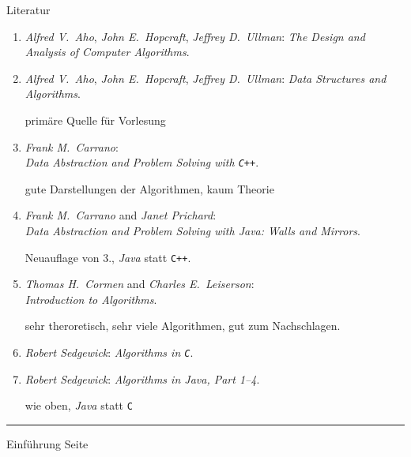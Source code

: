 \documentclass{slides}
\newcounter{mypage}
\begin{document}
\begin{slide}{}
\normalsize

\begin{center}
Literatur
\end{center}
\vspace*{0.5cm}

\footnotesize
\begin{enumerate}
\item \textsl{Alfred V.~Aho}, \textsl{John E.~Hopcraft}, \textsl{Jeffrey D.~Ullman}:
      \emph{The Design and Analysis of Computer Algorithms}. 

\item \textsl{Alfred V.~Aho}, \textsl{John E.~Hopcraft}, \textsl{Jeffrey D.~Ullman}:
      \emph{Data Structures and Algorithms}. 

      prim\"are Quelle f\"ur Vorlesung
\item \textsl{Frank M.~Carrano}: \\
      \emph{Data Abstraction and Problem Solving with \texttt{C++}}.

      gute Darstellungen der Algorithmen, kaum Theorie
\item \textsl{Frank M.~Carrano} and \emph{Janet Prichard}: \\
      \emph{Data Abstraction and Problem Solving with \textsl{Java}: Walls and Mirrors}.

      Neuauflage von 3., \textsl{Java} statt \texttt{C++}.

\item \textsl{Thomas H.~Cormen} and \textsl{Charles E.~Leiserson}: \\
      \emph{Introduction to Algorithms}. 

      sehr theroretisch, sehr viele Algorithmen, gut zum Nachschlagen.

\item \textsl{Robert Sedgewick}: 
      \emph{Algorithms in \texttt{C}}.

\item \textsl{Robert Sedgewick}: 
      \emph{Algorithms in \textsl{Java}, Part 1--4}.
    
      wie oben, \textsl{Java} statt \texttt{C}
\end{enumerate}


\vspace*{\fill}
\tiny \addtocounter{mypage}{1}
\rule{17cm}{1mm}
Einf\"uhrung \hspace*{\fill} Seite 
\end{slide}
\end{document}
